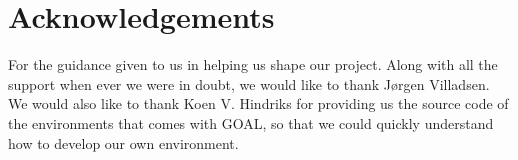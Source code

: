 \chapter{Acknowledgements}

For the guidance given to us in helping us shape our project. Along with all the support when ever we were in doubt, we would like to thank J{\o}rgen Villadsen.
\\
We would also like to thank Koen V. Hindriks for providing us the 
source code of the environments that comes with GOAL, so that we could quickly understand how to develop our own environment.

